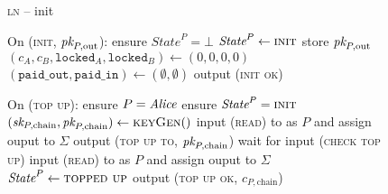 \begin{figure}[H]
  \begin{processbox}{\textsc{ln} -- init}
    \begin{algorithmic}[1]
      \State {}
      \State {}
      \State On (\textsc{init}, $\textit{pk}_{P, \mathrm{out}}$):
      \Indent
        \State ensure $\textit{State}^P = \bot$
        \State $\textit{State}^P \gets \textsc{init}$
        \State store $\textit{pk}_{P, \mathrm{out}}$
        \State $(c_A, c_B, \texttt{locked}_A, \texttt{locked}_B) \gets (0, 0, 0,
        0)$
        \State $(\texttt{paid\_out}, \texttt{paid\_in}) \gets (\emptyset,
        \emptyset)$
        \State output (\textsc{init ok})
      \EndIndent
      \Statex

      \State On (\textsc{top up}):
      \Indent
        \State ensure $P = \mathit{Alice}$ 
        \State ensure $\textit{State}^P = \textsc{init}$
        \State $(\textit{sk}_{P, \mathrm{chain}}, \textit{pk}_{P, \mathrm{chain}}) \gets
        \textsc{keyGen}()$
        \State input (\textsc{read}) to \ledger as $P$ and assign ouput to
        $\Sigma$
        \State output (\textsc{top up to}, $\textit{pk}_{P, \mathrm{chain}}$)
          \State {}
          \State wait for input (\textsc{check top up})
          \State input (\textsc{read}) to \ledger as $P$ and assign ouput to
          $\Sigma$
        \EndWhile
        \State $\textit{State}^P \gets \textsc{topped up}$
        \State output (\textsc{top up ok}, $c_{P, \mathrm{chain}}$)
      \EndIndent
    \end{algorithmic}
  \end{processbox}
  \caption{}
  \label{code:ln:init}
\end{figure}

